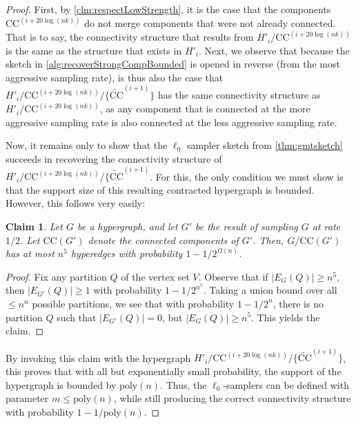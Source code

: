 \documentclass[11pt]{article}
\newtheorem{claim}[theorem]{Claim}
\theoremstyle{definition}
\begin{document}
\begin{proof}
First, by \cref{clm:respectLowStrength}, it is the case that the components $\mathrm{CC}^{(i + 20 \log(nk))}$ do not merge components that were not already connected. That is to say, the connectivity structure that results from $H'_i / \mathrm{CC}^{(i + 20 \log(nk))}$ is the same as the structure that exists in $H'_i$. Next, we observe that because the sketch in \cref{alg:recoverStrongCompBounded} is opened in reverse (from the most aggressive sampling rate), is thus also the case that $H'_i / \mathrm{CC}^{(i + 20 \log(nk))} / \{\widetilde{\mathrm{CC}}^{(i+1)}\}$ has the same connectivity structure as $H'_i / \mathrm{CC}^{(i + 20 \log(nk))}$, as any component that is connected at the more aggressive sampling rate is also connected at the less aggressive sampling rate.

Now, it remains only to show that the $\ell_0$ sampler sketch from \cref{thm:gmtsketch} succeeds in recovering the connectivity structure of $H'_i / \mathrm{CC}^{(i + 20 \log(nk))} / \{\widetilde{\mathrm{CC}}^{(i+1)}$. For this, the only condition we must show is that the support size of this resulting contracted hypergraph is bounded. However, this follows very easily: 

\begin{claim}
	Let $G$ be a hypergraph, and let $G'$ be the result of sampling $G$ at rate $1/2$. Let $\mathrm{CC}(G')$ denote the connected components of $G'$. Then, $G / \mathrm{CC}(G')$ has at most $n^5$ hyperedges with probability $1 - 1 / 2^{\Omega(n)}$.
\end{claim}

\begin{proof}
Fix any partition $Q$ of the vertex set $V$. Observe that if $|E_G(Q)| \geq n^5$, then $|E_{G'}(Q)| \geq 1$ with probability $1 - 1 / 2^{n^5}$. Taking a union bound over all $\leq n^n$ possible partitions, we see that with probability $1 - 1 / 2^n$, there is no partition $Q$ such that $|E_{G'}(Q)| = 0$, but $|E_G(Q)| \geq n^5$. This yields the claim. 
\end{proof}

By invoking this claim with the hypergraph $H'_i / \mathrm{CC}^{(i + 20 \log(nk))} / \{\widetilde{\mathrm{CC}}^{(i+1)} \}$, this proves that with all but exponentially small probability, the support of the hypergraph is bounded by $\mathrm{poly}(n)$. Thus, the $\ell_0$-samplers can be defined with parameter $m \leq \mathrm{poly}(n)$, while still producing the correct connectivity structure with probability $1 - 1 / \mathrm{poly}(n)$. 
\end{proof}
\end{document}

